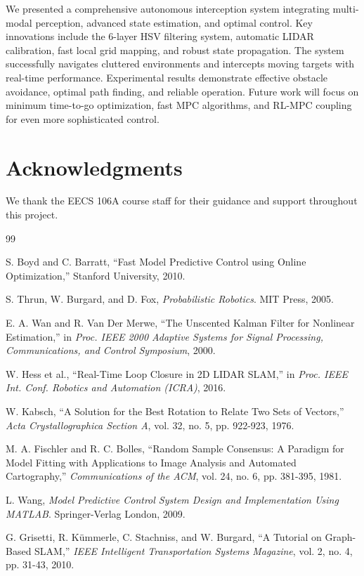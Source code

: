\documentclass[11pt,a4paper]{article}
\begin{document}
We presented a comprehensive autonomous interception system integrating multi-modal perception, advanced state estimation, and optimal control. Key innovations include the 6-layer HSV filtering system, automatic LIDAR calibration, fast local grid mapping, and robust state propagation. The system successfully navigates cluttered environments and intercepts moving targets with real-time performance. Experimental results demonstrate effective obstacle avoidance, optimal path finding, and reliable operation. Future work will focus on minimum time-to-go optimization, fast MPC algorithms, and RL-MPC coupling for even more sophisticated control.

\section{Acknowledgments}

We thank the EECS 106A course staff for their guidance and support throughout this project.


\begin{thebibliography}{99}

S. Boyd and C. Barratt, ``Fast Model Predictive Control using Online Optimization,'' Stanford University, 2010.

S. Thrun, W. Burgard, and D. Fox, \textit{Probabilistic Robotics}. MIT Press, 2005.

E. A. Wan and R. Van Der Merwe, ``The Unscented Kalman Filter for Nonlinear Estimation,'' in \textit{Proc. IEEE 2000 Adaptive Systems for Signal Processing, Communications, and Control Symposium}, 2000.

W. Hess et al., ``Real-Time Loop Closure in 2D LIDAR SLAM,'' in \textit{Proc. IEEE Int. Conf. Robotics and Automation (ICRA)}, 2016.

W. Kabsch, ``A Solution for the Best Rotation to Relate Two Sets of Vectors,'' \textit{Acta Crystallographica Section A}, vol. 32, no. 5, pp. 922-923, 1976.

M. A. Fischler and R. C. Bolles, ``Random Sample Consensus: A Paradigm for Model Fitting with Applications to Image Analysis and Automated Cartography,'' \textit{Communications of the ACM}, vol. 24, no. 6, pp. 381-395, 1981.

L. Wang, \textit{Model Predictive Control System Design and Implementation Using MATLAB}. Springer-Verlag London, 2009.

G. Grisetti, R. Kümmerle, C. Stachniss, and W. Burgard, ``A Tutorial on Graph-Based SLAM,'' \textit{IEEE Intelligent Transportation Systems Magazine}, vol. 2, no. 4, pp. 31-43, 2010.

\end{thebibliography}
\end{document}
